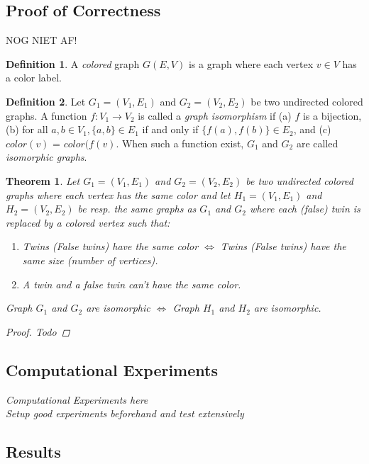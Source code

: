 \documentclass[twoside]{article}
\theoremstyle{definition}
\newtheorem{definition}{Definition}
\theoremstyle{plain}
\newtheorem{theorem}{Theorem}
\begin{document}
\begin{multicols}{2}
\section{Proof of Correctness}
NOG NIET AF!
\begin{definition}
A \emph{colored} graph $G(E,V)$ is a graph where each vertex $v \in V$ has a color label.
\end{definition}
\begin{definition}
Let $G_1 = (V_1, E_1)$ and $G_2 = (V_2, E_2)$ be two undirected colored graphs. A function $f: V_1 \to V_2$ is called a \emph{graph isomorphism} if (a) $f$ is a bijection, (b) for all $a, b \in V_1, \{a, b\} \in E_1$ if and only if $\{f(a), f(b)\} \in E_2$, and (c) $color(v)$ = $color (f(v)$. When such a function exist, $G_1$ and $G_2$ are called \emph{isomorphic graphs}. 
\end{definition}
\begin{theorem}
Let $G_1 = (V_1, E_1)$ and $G_2 = (V_2, E_2)$ be two undirected colored graphs where each vertex has the same color and let $H_1 = (V_1, E_1)$ and $H_2 = (V_2, E_2)$ be resp. the same graphs as $G_1$ and $G_2$ where each (false) twin is replaced by a colored vertex such that: \begin{enumerate}
\item Twins (False twins) have the same color $\iff$ Twins (False twins) have the same size (number of vertices).
\item A twin and a false twin can't have the same color.
\end{enumerate}
Graph $G_1$ and $G_2$ are isomorphic $\iff$ Graph $H_1$ and $H_2$ are isomorphic.
\begin{proof}
Todo
\end{proof}


\section{Computational Experiments}

Computational Experiments here\\
Setup good experiments beforehand and test extensively

\section{Results}


\end{theorem}
\end{multicols}
\end{document}
